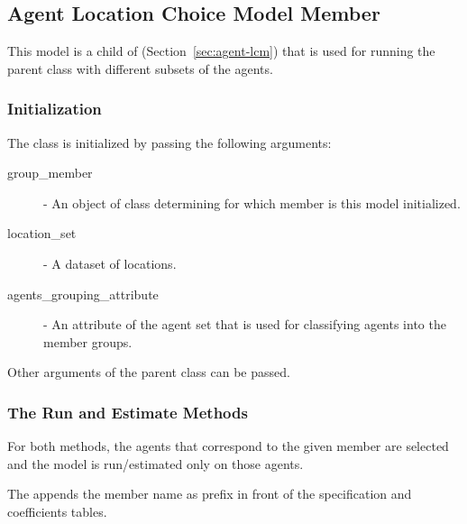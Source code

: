 \subsection{Agent Location Choice Model Member}
%
\modelsindex
\label{sec:agent-lcm-member}
%
This model is a child of  (Section~\ref{sec:agent-lcm}) that is used 
for running the parent class with different subsets of the agents.

\subsubsection{Initialization}
%
The class is initialized by passing the following arguments:
\begin{description}
\item[group_member] - An object of class  determining for which member is this model initialized.
\item[location_set] - A dataset of locations.
\item[agents_grouping_attribute] - An attribute of the agent set that is used for classifying agents into the member groups. 
\end{description}
Other arguments of the parent class can be passed. 

\subsubsection{The Run and Estimate Methods}
%
For both methods, the agents that correspond to the given member are selected and the model is run/estimated only
on those agents. 

The  appends the member name as prefix in front of the specification and coefficients tables.

